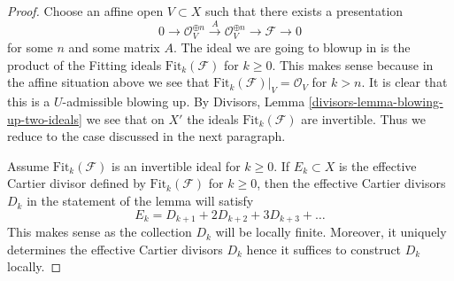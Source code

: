 \begin{proof}
Choose an affine open $V \subset X$ such that there exists a presentation
$$
0 \to \mathcal{O}_V^{\oplus n} \xrightarrow{A} \mathcal{O}_V^{\oplus n} \to
\mathcal{F} \to 0
$$
for some $n$ and some matrix $A$. The ideal we are going to blowup in
is the product of the Fitting ideals $\text{Fit}_k(\mathcal{F})$
for $k \geq 0$. This makes sense because in the affine
situation above we see that $\text{Fit}_k(\mathcal{F})|_V = \mathcal{O}_V$
for $k > n$. It is clear that this is a $U$-admissible blowing up. By
Divisors, Lemma \ref{divisors-lemma-blowing-up-two-ideals}
we see that on $X'$ the ideals $\text{Fit}_k(\mathcal{F})$
are invertible. Thus we reduce to the case discussed in the
next paragraph.

\medskip\noindent
Assume $\text{Fit}_k(\mathcal{F})$ is an invertible ideal for
$k \geq 0$. If $E_k \subset X$ is the effective
Cartier divisor defined by $\text{Fit}_k(\mathcal{F})$
for $k \geq 0$, then the effective Cartier divisors
$D_k$ in the statement of the lemma will satisfy
$$
E_k = D_{k + 1} + 2 D_{k + 2} + 3 D_{k + 3} + \ldots
$$
This makes sense as the collection $D_k$ will be locally finite.
Moreover, it uniquely determines the effective Cartier divisors $D_k$
hence it suffices to construct $D_k$ locally.


\end{proof}
